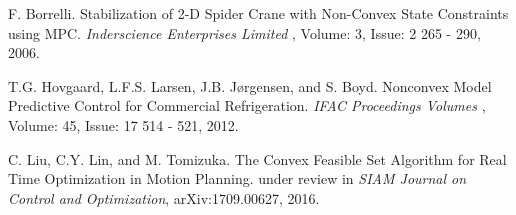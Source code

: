 \begin{thebibliography}{xx}
F. Borrelli.
\newblock Stabilization of 2-D Spider Crane with Non-Convex State Constraints using MPC.
\newblock \emph{ Inderscience Enterprises Limited  }, Volume: 3, Issue: 2 265 - 290, 2006.

T.G. Hovgaard, L.F.S. Larsen, J.B. Jørgensen, and S. Boyd.
\newblock Nonconvex Model Predictive Control for Commercial Refrigeration.
\newblock \emph{ IFAC Proceedings Volumes  }, Volume: 45, Issue: 17 514 - 521, 2012.

C. Liu, C.Y. Lin, and M. Tomizuka.
\newblock The Convex Feasible Set Algorithm for Real Time Optimization in Motion Planning.
\newblock under review in \emph{ SIAM Journal on Control and Optimization}, arXiv:1709.00627, 2016.








\end{thebibliography}

